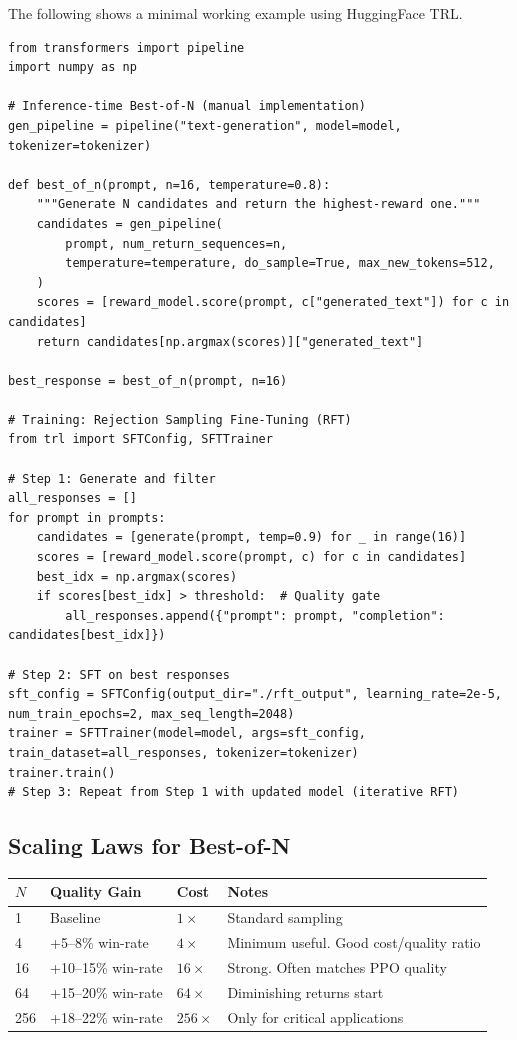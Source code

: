 The following shows a minimal working example using HuggingFace TRL.

\begin{lstlisting}[style=pythonstyle]
from transformers import pipeline
import numpy as np

# Inference-time Best-of-N (manual implementation)
gen_pipeline = pipeline("text-generation", model=model, tokenizer=tokenizer)

def best_of_n(prompt, n=16, temperature=0.8):
    """Generate N candidates and return the highest-reward one."""
    candidates = gen_pipeline(
        prompt, num_return_sequences=n,
        temperature=temperature, do_sample=True, max_new_tokens=512,
    )
    scores = [reward_model.score(prompt, c["generated_text"]) for c in candidates]
    return candidates[np.argmax(scores)]["generated_text"]

best_response = best_of_n(prompt, n=16)

# Training: Rejection Sampling Fine-Tuning (RFT)
from trl import SFTConfig, SFTTrainer

# Step 1: Generate and filter
all_responses = []
for prompt in prompts:
    candidates = [generate(prompt, temp=0.9) for _ in range(16)]
    scores = [reward_model.score(prompt, c) for c in candidates]
    best_idx = np.argmax(scores)
    if scores[best_idx] > threshold:  # Quality gate
        all_responses.append({"prompt": prompt, "completion": candidates[best_idx]})

# Step 2: SFT on best responses
sft_config = SFTConfig(output_dir="./rft_output", learning_rate=2e-5, num_train_epochs=2, max_seq_length=2048)
trainer = SFTTrainer(model=model, args=sft_config, train_dataset=all_responses, tokenizer=tokenizer)
trainer.train()
# Step 3: Repeat from Step 1 with updated model (iterative RFT)
\end{lstlisting}

\subsection{Scaling Laws for Best-of-N}
\label{scaling-laws-for-best-of-n}

\begin{tabular}{@{}lp{3.5cm}p{3.5cm}p{6cm}@{}}
\toprule
$N$ & \textbf{Quality Gain} & \textbf{Cost} & \textbf{Notes} \\
\midrule
1 & Baseline & $1\times$ & Standard sampling \\
4 & +5--8\% win-rate & $4\times$ & Minimum useful. Good cost/quality ratio \\
16 & +10--15\% win-rate & $16\times$ & Strong. Often matches PPO quality \\
64 & +15--20\% win-rate & $64\times$ & Diminishing returns start \\
256 & +18--22\% win-rate & $256\times$ & Only for critical applications \\
\bottomrule
\end{tabular}

